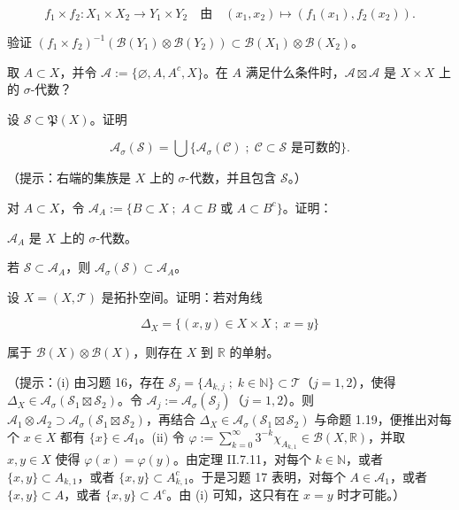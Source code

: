 \begin{exercises}
\[
f_1\times f_2 : X_1\times X_2 \to Y_1\times Y_2 \quad\text{由}\quad (x_1,x_2)\mapsto (f_1(x_1), f_2(x_2)) .
\]

验证 $ (f_1\times f_2)^{-1}(\mathcal{B}(Y_1)\otimes\mathcal{B}(Y_2))\subset\mathcal{B}(X_1)\otimes\mathcal{B}(X_2) $。

\item

取 $ A\subset X $，并令 $ \mathcal{A} := \{\varnothing, A, A^{c}, X\} $。在 $ A $ 满足什么条件时，$ \mathcal{A}\boxtimes\mathcal{A} $ 是 $ X\times X $ 上的 $ \sigma $-代数？

\item

设 $ \mathcal{S}\subset\mathfrak{P}(X) $。证明

\[
\mathcal{A}_\sigma(\mathcal{S}) = \bigcup\{ \mathcal{A}_\sigma(\mathcal{C}) \;;\; \mathcal{C}\subset\mathcal{S} \text{ 是可数的} \} .
\]

（提示：右端的集族是 $ X $ 上的 $ \sigma $-代数，并且包含 $ \mathcal{S} $。）

\item

对 $ A\subset X $，令 $ \mathcal{A}_A := \{ B\subset X \;;\; A\subset B \text{ 或 } A\subset B^{c} \} $。证明：

\begin{subitems}
\item

$ \mathcal{A}_A $ 是 $ X $ 上的 $ \sigma $-代数。

\item

若 $ \mathcal{S}\subset\mathcal{A}_A $，则 $ \mathcal{A}_\sigma(\mathcal{S})\subset\mathcal{A}_A $。

\end{subitems}

\item

设 $ X=(X,\mathcal{T}) $ 是拓扑空间。证明：若对角线

\[
\Delta_X = \{ (x,y)\in X\times X \;;\; x=y \}
\]

属于 $ \mathcal{B}(X)\otimes\mathcal{B}(X) $，则存在 $ X $ 到 $ \mathbb{R} $ 的单射。

（提示：(i) 由习题 16，存在 $ \mathcal{S}_j = \{ A_{k,j} \;;\; k\in\mathbb{N} \}\subset\mathcal{T} $（$ j=1,2 $），使得 $ \Delta_X\in\mathcal{A}_\sigma(\mathcal{S}_1\boxtimes\mathcal{S}_2) $。令 $ \mathcal{A}_j := \mathcal{A}_\sigma(\mathcal{S}_j) $（$ j=1,2 $）。则 $ \mathcal{A}_1\otimes\mathcal{A}_2\supset\mathcal{A}_\sigma(\mathcal{S}_1\boxtimes\mathcal{S}_2) $，再结合 $ \Delta_X\in\mathcal{A}_\sigma(\mathcal{S}_1\boxtimes\mathcal{S}_2) $ 与命题 1.19，便推出对每个 $ x\in X $ 都有 $ \{x\}\in\mathcal{A}_1 $。(ii) 令 $ \varphi := \sum_{k=0}^{\infty} 3^{-k}\chi_{A_{k,1}} \in \mathcal{B}(X,\mathbb{R}) $，并取 $ x,y\in X $ 使得 $ \varphi(x)=\varphi(y) $。由定理 II.7.11，对每个 $ k\in\mathbb{N} $，或者 $ \{x,y\}\subset A_{k,1} $，或者 $ \{x,y\}\subset A_{k,1}^{c} $。于是习题 17 表明，对每个 $ A\in\mathcal{A}_1 $，或者 $ \{x,y\}\subset A $，或者 $ \{x,y\}\subset A^{c} $。由 (i) 可知，这只有在 $ x=y $ 时才可能。）


\end{exercises}

